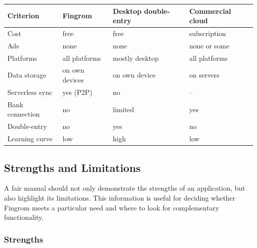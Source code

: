 \begin{center}
\footnotesize
\begin{tabularx}{\textwidth}{|l|X|X|X|}
  \hline
  \textbf{Criterion} & \textbf{Fingrom} & \textbf{Desktop double-entry} & \textbf{Commercial cloud} \\
  \hline
  Cost & free & free & subscription \\
  Ads & none & none & none or some \\
  Platforms & all platforms & mostly desktop & all platforms \\
  Data storage & on own devices & on own device & on servers \\
  Serverless sync & yes (P2P) & no & -- \\
  Bank connection & no & limited & yes \\
  Double-entry & no & yes & no \\
  Learning curve & low & high & low \\
  \hline
\end{tabularx}
\end{center}


\subsection{Strengths and Limitations}

A fair manual should not only demonstrate the strengths of an application, but also highlight
its limitations. This information is useful for deciding whether Fingrom meets a particular
need and where to look for complementary functionality.

\subsubsection{Strengths}

